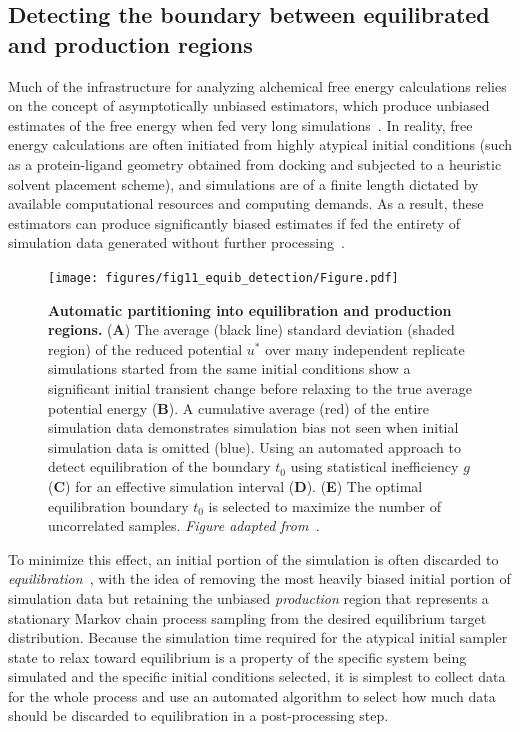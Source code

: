 \documentclass[9pt,bestpractices]{livecoms}
\begin{document}
\subsection{Detecting the boundary between equilibrated and production regions}
\label{sec:automatic-equilibration-detection}
Much of the infrastructure for analyzing alchemical free energy calculations relies on the concept of asymptotically unbiased estimators, which produce unbiased estimates of the free energy when fed very long simulations~\cite{shirts2005comparison}.
In reality, free energy calculations are often initiated from highly atypical initial conditions (such as a protein-ligand geometry obtained from docking and subjected to a heuristic solvent placement scheme), and simulations are of a finite length dictated by available computational resources and computing demands.
As a result, these estimators can produce significantly biased estimates if fed the entirety of simulation data generated without further processing~\cite{chodera2016simple}.
\begin{figure}
    \centering
    \texttt{[image: figures/fig11\_equib\_detection/Figure.pdf]}
    \caption{{\bf Automatic partitioning into equilibration and production regions.}
    (\textbf{A}) The average (black line) standard deviation (shaded region) of the reduced potential $u^*$ over many independent replicate simulations started from the same initial conditions show a significant initial transient change before relaxing to the true average potential energy (\textbf{B}). A cumulative average (red) of the entire simulation data demonstrates simulation bias not seen when initial simulation data is omitted (blue). Using an automated approach to detect equilibration of the boundary $t_0$ using statistical inefficiency $g$ (\textbf{C})  for an effective simulation interval (\textbf{D}). (\textbf{E}) The optimal equilibration boundary $t_0$ is selected to maximize the number of uncorrelated samples.
    \emph{Figure adapted from~\cite{chodera2016simple}.}
    }
    \label{fig:automatic-equilibration-detection}
\end{figure}

To minimize this effect, an initial portion of the simulation is often discarded to \emph{equilibration}~\cite{braun2019best}, with the idea of removing the most heavily biased initial portion of simulation data but retaining the unbiased \emph{production} region that represents a stationary Markov chain process sampling from the desired equilibrium target distribution.
Because the simulation time required for the atypical initial sampler state to relax toward equilibrium is a property of the specific system being simulated and the specific initial conditions selected, it is simplest to collect data for the whole process and use an automated algorithm to select how much data should be discarded to equilibration in a post-processing step.
\end{document}
